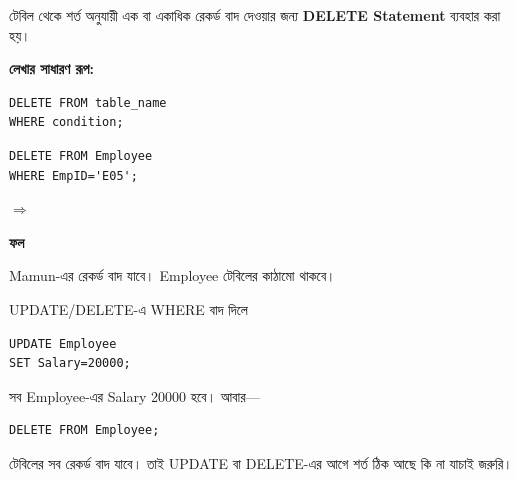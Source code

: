 \begin{definitionbox}{}

টেবিল থেকে শর্ত অনুযায়ী এক বা একাধিক রেকর্ড বাদ দেওয়ার
জন্য \textbf{DELETE Statement} ব্যবহার করা হয়।

\end{definitionbox}

\textbf{লেখার সাধারণ রূপ:}

\par\noindent\begin{minipage}{\linewidth}
\begin{verbatim}
DELETE FROM table_name
WHERE condition;
\end{verbatim}
\end{minipage}\par

\noindent\begin{minipage}{\linewidth}

\noindent\begin{minipage}[c]{.53\linewidth}
\begin{verbatim}
DELETE FROM Employee
WHERE EmpID='E05';
\end{verbatim}
\end{minipage}\hfill\begin{minipage}[c]{.04\linewidth}\raggedright{\color{chSixTeal}$\Rightarrow$}\end{minipage}\hfill
\begin{minipage}[c]{.40\linewidth}\raggedright\footnotesize\setlength{\tabcolsep}{2pt}\textbf{ফল}\par\smallskip
{}
\end{minipage}
\end{minipage}\par\smallskip

Mamun-এর রেকর্ড বাদ যাবে। Employee টেবিলের কাঠামো থাকবে।

\begin{mistakebox}{UPDATE/DELETE-এ WHERE বাদ দিলে}

\par\noindent\begin{minipage}{\linewidth}
\begin{verbatim}
UPDATE Employee
SET Salary=20000;
\end{verbatim}
\end{minipage}\par

সব Employee-এর Salary 20000 হবে। আবার—

\par\noindent\begin{minipage}{\linewidth}
\begin{verbatim}
DELETE FROM Employee;
\end{verbatim}
\end{minipage}\par

টেবিলের সব রেকর্ড বাদ যাবে। তাই UPDATE বা DELETE-এর আগে শর্ত ঠিক আছে কি না যাচাই জরুরি।

\end{mistakebox}

